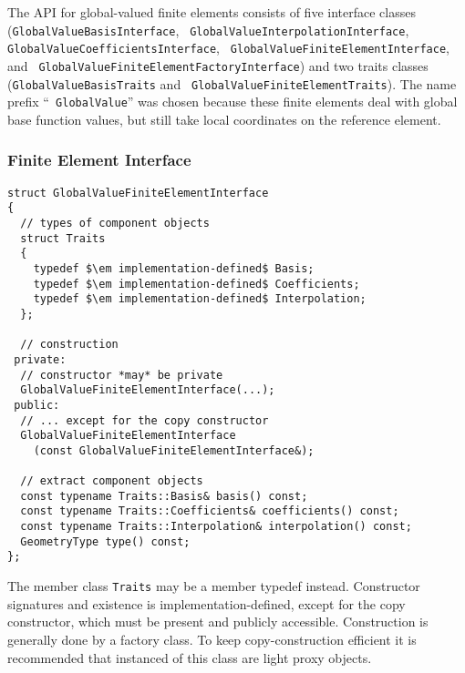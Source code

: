 \documentclass[a4paper,11pt]{article}
\begin{document}
The API for global-valued finite elements consists of five interface classes
({\tt Global\-Value\-Basis\-Interface}, {\tt
  GlobalValueInterpolationInterface}, {\tt
  Global\-Value\-Coefficients\-Interface}, {\tt
  GlobalValueFiniteElementInterface}, and {\tt
  Global\-Value\-Finite\-Element\-Factory\-Interface}) and two traits classes
({\tt GlobalValueBasisTraits} and {\tt
  Global\-Value\-Finite\-Element\-Traits}).  The name prefix ``{\tt
  GlobalValue}'' was chosen because these finite elements deal with global
base function values, but still take local coordinates on the reference
element.

\subsubsection{Finite Element Interface}

\begin{lstlisting}[escapechar=\$]
struct GlobalValueFiniteElementInterface
{
  // types of component objects
  struct Traits
  {
    typedef $\em implementation-defined$ Basis;
    typedef $\em implementation-defined$ Coefficients;
    typedef $\em implementation-defined$ Interpolation;
  };

  // construction
 private:
  // constructor *may* be private
  GlobalValueFiniteElementInterface(...);
 public:
  // ... except for the copy constructor
  GlobalValueFiniteElementInterface
    (const GlobalValueFiniteElementInterface&);

  // extract component objects
  const typename Traits::Basis& basis() const;
  const typename Traits::Coefficients& coefficients() const;
  const typename Traits::Interpolation& interpolation() const;
  GeometryType type() const;
};
\end{lstlisting}
The member class {\tt Traits} may be a member typedef instead.  Constructor
signatures and existence is implementation-defined, except for the copy
constructor, which must be present and publicly accessible.  Construction is
generally done by a factory class.  To keep copy-construction efficient it is
recommended that instanced of this class are light proxy objects.
\end{document}
